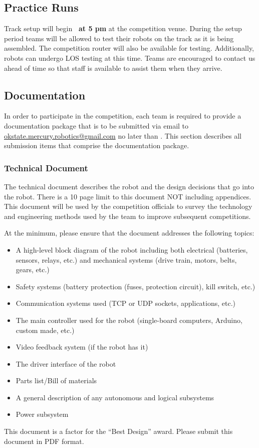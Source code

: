 \subsection{Practice Runs}
Track setup will begin \textbf{\los \ at 5 pm} at the competition venue. During the setup period teams will be allowed to test their robots on the track as it is being assembled. The competition router will also be available for testing. Additionally, robots can undergo LOS testing at this time. Teams are encouraged to contact us ahead of time so that staff is available to assist them when they arrive.

\subsection{Documentation}
In order to participate in the competition, each team is required to provide a documentation package that is to be submitted via email to \href{mailto:okstate.mercury.robotics@gmail.com}{ okstate.mercury.robotics@gmail.com} no later than \textbf{\documentation}. This section describes all submission items that comprise the documentation package.

\subsubsection{Technical Document}
The technical document describes the robot and the design decisions that go into the robot. There is a 10 page limit to this document NOT including appendices. This document will be used by the competition officials to survey the technology and engineering methods used by the team to improve subsequent competitions. 

At the minimum, please ensure that the document addresses the following topics:

\begin{itemize}
\item A high-level block diagram of the robot including both electrical (batteries, sensors, relays, etc.) and mechanical systems (drive train, motors, belts, gears, etc.)
\item Safety systems (battery protection (fuses, protection circuit), kill switch, etc.)
\item Communication systems used (TCP or UDP sockets, applications, etc.)
\item The main controller used for the robot (single-board computers, Arduino, custom made, etc.)
\item Video feedback system (if the robot has it)
\item The driver interface of the robot
\item Parts list/Bill of materials
\item A general description of any autonomous and logical subsystems
\item Power subsystem	
\end{itemize}
This document is a factor for the “Best Design” award. Please submit this document in PDF format.
